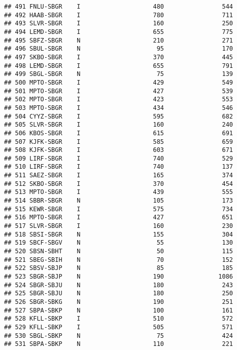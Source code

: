 \documentclass[
]{article}
\begin{document}
\begin{verbatim}
## 491 FNLU-SBGR    I                    480                544
## 492 HAAB-SBGR    I                    780                711
## 493 SLVR-SBGR    I                    160                250
## 494 LEMD-SBGR    I                    655                775
## 495 SBFZ-SBGR    N                    210                271
## 496 SBUL-SBGR    N                     95                170
## 497 SKBO-SBGR    I                    370                445
## 498 LEMD-SBGR    I                    655                791
## 499 SBGL-SBGR    N                     75                139
## 500 MPTO-SBGR    I                    429                549
## 501 MPTO-SBGR    I                    427                539
## 502 MPTO-SBGR    I                    423                553
## 503 MPTO-SBGR    I                    434                546
## 504 CYYZ-SBGR    I                    595                682
## 505 SLVR-SBGR    I                    160                240
## 506 KBOS-SBGR    I                    615                691
## 507 KJFK-SBGR    I                    585                659
## 508 KJFK-SBGR    I                    603                671
## 509 LIRF-SBGR    I                    740                529
## 510 LIRF-SBGR    I                    740                137
## 511 SAEZ-SBGR    I                    165                374
## 512 SKBO-SBGR    I                    370                454
## 513 MPTO-SBGR    I                    439                555
## 514 SBBR-SBGR    N                    105                173
## 515 KEWR-SBGR    I                    575                734
## 516 MPTO-SBGR    I                    427                651
## 517 SLVR-SBGR    I                    160                230
## 518 SBSI-SBGR    N                    155                304
## 519 SBCF-SBGV    N                     55                130
## 520 SBSN-SBHT    N                     50                115
## 521 SBEG-SBIH    N                     70                152
## 522 SBSV-SBJP    N                     85                185
## 523 SBGR-SBJP    N                    190               1086
## 524 SBGR-SBJU    N                    180                243
## 525 SBGR-SBJU    N                    180                250
## 526 SBGR-SBKG    N                    190                251
## 527 SBPA-SBKP    N                    100                161
## 528 KFLL-SBKP    I                    510                572
## 529 KFLL-SBKP    I                    505                571
## 530 SBGL-SBKP    N                     75                424
## 531 SBPA-SBKP    N                    110                221

\end{verbatim}
\end{document}
